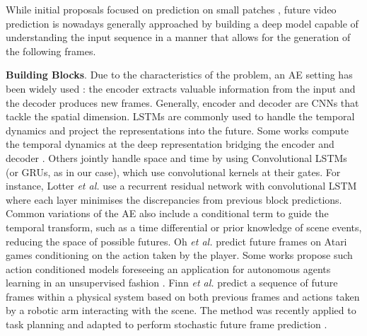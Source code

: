 \documentclass[runningheads]{llncs}
\begin{document}
While initial proposals focused on prediction on small patches \cite{ranzato2014baseline,michalski2014modeling}, future video prediction is nowadays generally approached by building a deep model capable of understanding the input sequence in a manner that allows for the generation of the following frames. 

\textbf{Building Blocks}. Due to the characteristics of the problem, an AE setting has been widely used \cite{srivastava2015unsupervised,oh2015action,finn2016unsupervised,villegas2017decomposing,denton2017disentangled}: the encoder extracts valuable information from the input and the decoder produces new frames. Generally, encoder and decoder are CNNs that tackle the spatial dimension. LSTMs are commonly used to handle the temporal dynamics and project the representations into the future. Some works compute the temporal dynamics at the deep representation bridging the encoder and decoder \cite{oh2015action,patraucean2015spatio,cricri2016video,denton2017disentangled}. Others jointly handle space and time by using Convolutional LSTMs \cite{finn2016unsupervised,lotter2016deep,patraucean2015spatio,kalchbrenner2017vpn,liang2017dual} (or GRUs, as in our case), which use convolutional kernels at their gates. For instance, Lotter \emph{et al.} \cite{lotter2016deep} use a recurrent residual network with convolutional LSTM where each layer minimises the discrepancies from previous block predictions. Common variations of the AE also include a conditional term to guide the temporal transform, such as a time differential \cite{vukotic2017one} or prior knowledge of scene events, reducing the space of possible futures. Oh \emph{et al.} \cite{oh2015action} predict future frames on Atari games conditioning on the action taken by the player. Some works propose such action conditioned models foreseeing an application for autonomous agents learning in an unsupervised fashion \cite{finn2016unsupervised,kalchbrenner2017vpn}. Finn \emph{et al.} \cite{finn2016unsupervised} predict a sequence of future frames within a physical system based on both previous frames and actions taken by a robotic arm interacting with the scene. The method was recently applied to task planning \cite{ebert2017self} and adapted to perform stochastic future frame prediction \cite{babaeizadeh2018stochastic}.
\end{document}
